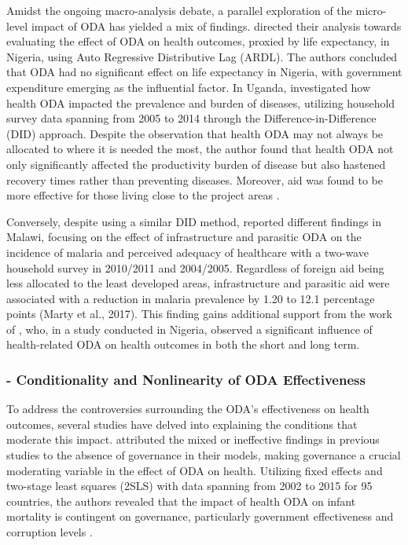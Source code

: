 Amidst the ongoing macro-analysis debate, a parallel exploration of the micro-level impact of ODA has yielded a mix of findings. \textcite{akinola_foreign_2022} directed their analysis towards evaluating the effect of ODA on health outcomes, proxied by life expectancy, in Nigeria, using Auto Regressive Distributive Lag (ARDL). The authors concluded that ODA had no significant effect on life expectancy in Nigeria, with government expenditure emerging as the influential factor. In Uganda, \textcite{odokonyero_impact_2018} investigated how health ODA impacted the prevalence and burden of diseases, utilizing household survey data spanning from 2005 to 2014 through the Difference-in-Difference (DID) approach. Despite the observation that health ODA may not always be allocated to where it is needed the most, the author found that health ODA not only significantly affected the productivity burden of disease but also hastened recovery times rather than preventing diseases. Moreover, aid was found to be more effective for those living close to the project areas \parencite{odokonyero_impact_2018}. 

Conversely, despite using a similar DID method, \textcite{marty_taking_2017} reported 
different findings in Malawi, focusing on the effect of infrastructure and parasitic ODA on the incidence of malaria and perceived adequacy of healthcare with a two-wave household survey in 2010/2011 and 2004/2005. Regardless of foreign aid being less allocated to the least developed areas, infrastructure and parasitic aid were associated with a reduction in malaria prevalence by 1.20 to 12.1 percentage points (Marty et al., 2017). This finding gains additional support from the work of \textcite{muhammad_health_2021}, who, in a study conducted in Nigeria, observed a significant influence of health-related ODA on health outcomes in both the short and long term.

\subsubsection*{- Conditionality and Nonlinearity of ODA Effectiveness}

To address the controversies surrounding the ODA's effectiveness on health outcomes, several studies have delved into explaining the conditions that moderate this impact. \textcite{doucouliagos_health_2021} attributed the mixed or ineffective findings in previous studies to the absence of governance in their models, making governance a crucial moderating variable in the effect of ODA on health. Utilizing fixed effects and two-stage least squares (2SLS) with data spanning from 2002 to 2015 for 95 countries, the authors revealed that the impact of health ODA on infant mortality is contingent on governance, particularly government effectiveness and corruption levels \parencite{doucouliagos_health_2021}.

